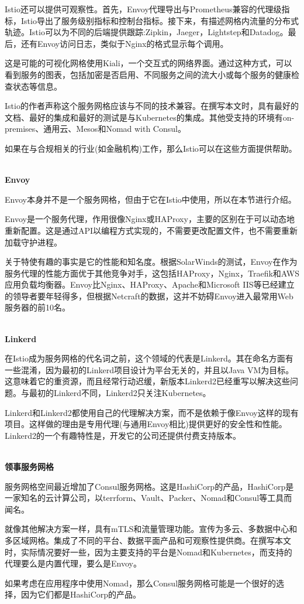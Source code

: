 Istio还可以提供可观察性。首先，Envoy代理导出与Prometheus兼容的代理级指标，Istio导出了服务级别指标和控制台指标。接下来，有描述网格内流量的分布式轨迹。Istio可以为不同的后端提供跟踪:Zipkin，Jaeger，Lightstep和Datadog。最后，还有Envoy访问日志，类似于Nginx的格式显示每个调用。

这是可能的可视化网格使用Kiali，一个交互式的网络界面。通过这种方式，可以看到服务的图表，包括加密是否启用、不同服务之间的流大小或每个服务的健康检查状态等信息。

Istio的作者声称这个服务网格应该与不同的技术兼容。在撰写本文时，具有最好的文档、最好的集成和最好的测试是与Kubernetes的集成。其他受支持的环境有on-premises、通用云、Mesos和Nomad with Consul。

如果在与合规相关的行业(如金融机构)工作，那么Istio可以在这些方面提供帮助。

\hspace*{\fill} \\ %
\noindent
\textbf{Envoy}

Envoy本身并不是一个服务网格，但由于它在Istio中使用，所以在本节进行介绍。

Envoy是一个服务代理，作用很像Nginx或HAProxy，主要的区别在于可以动态地重新配置。这是通过API以编程方式实现的，不需要更改配置文件，也不需要重新加载守护进程。

关于特使有趣的事实是它的性能和知名度。根据SolarWinds的测试，Envoy在作为服务代理的性能方面优于其他竞争对手，这包括HAProxy，Nginx，Traefik和AWS应用负载均衡器。Envoy比Nginx、HAProxy、Apache和Microsoft IIS等已经建立的领导者要年轻得多，但根据Netcraft的数据，这并不妨碍Envoy进入最常用Web服务器的前10名。

\hspace*{\fill} \\ %
\noindent
\textbf{Linkerd}

在Istio成为服务网格的代名词之前，这个领域的代表是Linkerd。其在命名方面有一些混淆，因为最初的Linkerd项目设计为平台无关的，并且以Java VM为目标。这意味着它的重资源，而且经常行动迟缓，新版本Linkerd2已经重写以解决这些问题。与最初的Linkerd不同，Linkerd2只关注Kubernetes。

Linkerd和Linkerd2都使用自己的代理解决方案，而不是依赖于像Envoy这样的现有项目。这样做的理由是专用代理(与通用Envoy相比)提供更好的安全性和性能。Linkerd2的一个有趣特性是，开发它的公司还提供付费支持版本。

\hspace*{\fill} \\ %
\noindent
\textbf{领事服务网格}

服务网格空间最近增加了Consul服务网格。这是HashiCorp的产品，HashiCorp是一家知名的云计算公司，以terrform、Vault、Packer、Nomad和Consul等工具而闻名。

就像其他解决方案一样，具有mTLS和流量管理功能。宣传为多云、多数据中心和多区域网格。集成了不同的平台、数据平面产品和可观察性提供商。在撰写本文时，实际情况要好一些，因为主要支持的平台是Nomad和Kubernetes，而支持的代理要么是内置代理，要么是Envoy。

如果考虑在应用程序中使用Nomad，那么Consul服务网格可能是一个很好的选择，因为它们都是HashiCorp的产品。






















